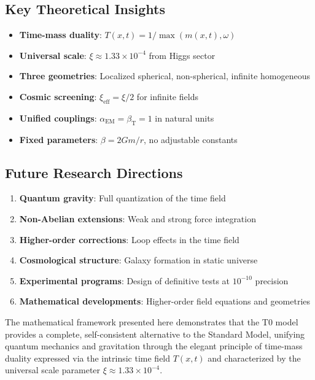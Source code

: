 \documentclass[12pt,a4paper]{article}
\newcommand{\betaT}{\beta_{\text{T}}}
\newcommand{\alphaEM}{\alpha_{\text{EM}}}
\newcommand{\xipar}{\xi}
\theoremstyle{definition}
\theoremstyle{remark}
\begin{document}
	\subsection{Key Theoretical Insights}
	\label{subsec:key_insights}
	
	\begin{tcolorbox}[colback=green!5!white,colframe=green!75!black,title=T0 Model: Core Mathematical Results]
		\begin{itemize}
			\item \textbf{Time-mass duality}: $T(x,t) = 1/\max(m(x,t), \omega)$
			\item \textbf{Universal scale}: $\xipar \approx 1.33 \times 10^{-4}$ from Higgs sector
			\item \textbf{Three geometries}: Localized spherical, non-spherical, infinite homogeneous
			\item \textbf{Cosmic screening}: $\xi_{\text{eff}} = \xipar/2$ for infinite fields
			\item \textbf{Unified couplings}: $\alphaEM = \betaT = 1$ in natural units
			\item \textbf{Fixed parameters}: $\beta = 2Gm/r$, no adjustable constants
		\end{itemize}
	\end{tcolorbox}
	
	\subsection{Future Research Directions}
	\label{subsec:future_directions}
	
	\begin{enumerate}
		\item \textbf{Quantum gravity}: Full quantization of the time field
		\item \textbf{Non-Abelian extensions}: Weak and strong force integration
		\item \textbf{Higher-order corrections}: Loop effects in the time field
		\item \textbf{Cosmological structure}: Galaxy formation in static universe
		\item \textbf{Experimental programs}: Design of definitive tests at $10^{-10}$ precision
		\item \textbf{Mathematical developments}: Higher-order field equations and geometries
	\end{enumerate}
	
	The mathematical framework presented here demonstrates that the T0 model provides a complete, self-consistent alternative to the Standard Model, unifying quantum mechanics and gravitation through the elegant principle of time-mass duality expressed via the intrinsic time field $T(x,t)$ and characterized by the universal scale parameter $\xipar \approx 1.33 \times 10^{-4}$.
	
\end{document}
